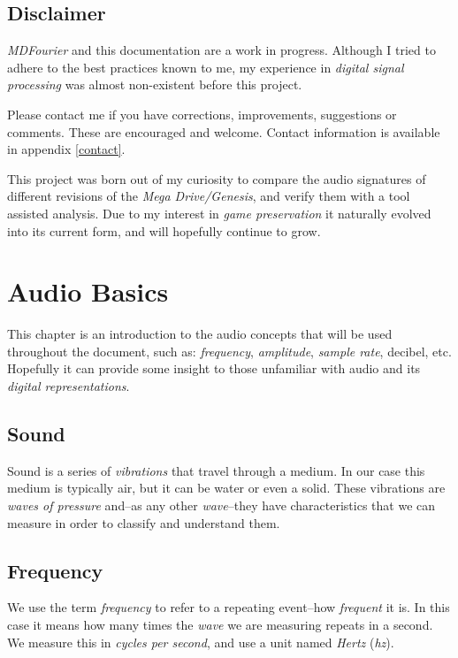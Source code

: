 \documentclass[10pt,a4paper]{report}
\newcommand{\ac}[1]{\textit{\acrshort{#1}}}
\begin{document}
\newpage
\section{Disclaimer}

\textit{MDFourier} and this documentation are a work in progress. Although I tried to adhere to the best practices known to me, my experience in \textit{digital signal processing} was almost non-existent before this project. 

Please contact me if you have corrections, improvements, suggestions or comments. These are encouraged and welcome. Contact information is available in appendix \ref{contact}.

This project was born out of my curiosity to compare the audio signatures of different revisions of the \textit{Mega Drive/Genesis}, and verify them with a tool assisted analysis. Due to my interest in \textit{game preservation} it naturally evolved into its current form, and will hopefully continue to grow.

\chapter{Audio Basics}

This chapter is an introduction to the audio concepts that will be used throughout the document, such as: \textit{frequency}, \textit{amplitude}, \textit{sample rate}, decibel, etc. Hopefully it can provide some insight to those unfamiliar with audio and its \textit{digital representations}.

\section{Sound}

Sound is a series of \textit{vibrations} that travel through a medium. In our case this medium is typically air, but it can be water or even a solid. These vibrations are \textit{waves of pressure} and--as any other \textit{wave}--they have characteristics that we can measure in order to classify and understand them. 

\section{Frequency}

We use the term \textit{frequency} to refer to a repeating event--how \textit{frequent} it is. In this case it means how many times the \textit{wave} we are measuring repeats in a second. We measure this in \textit{cycles per second}, and use a unit named \textit{Hertz} (\ac{hz}). 
\end{document}
